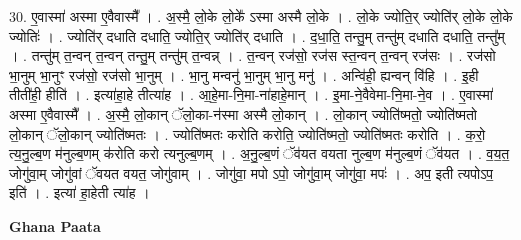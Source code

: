 \documentclass[17pt]{extarticle}
\begin{document}
30. ए॒वास्मा॑ अस्मा ए॒वैवास्मै᳚ । . अ॒स्मै॒ लो॒के लो॒के᳚ ऽस्मा अस्मै लो॒के । . लो॒के ज्योति॒र् ज्योति॑र् लो॒के लो॒के ज्योतिः॑ । . ज्योति॑र् दधाति दधाति॒ ज्योति॒र् ज्योति॑र् दधाति । . द॒धा॒ति॒ तन्तु॒म् तन्तु॑म् दधाति दधाति॒ तन्तु᳚म् । . तन्तु॑म् त॒न्वन् त॒न्वन् तन्तु॒म् तन्तु॑म् त॒न्वन्न् । . त॒न्वन् रज॑सो॒ रज॑स स्त॒न्वन् त॒न्वन् रज॑सः । . रज॑सो भा॒नुम् भा॒नुꣳ रज॑सो॒ रज॑सो भा॒नुम् । . भा॒नु मन्वनु॑ भा॒नुम् भा॒नु मनु॑ । . अन्वि॑ही॒ ह्यन्वन् वि॑हि । . इ॒ही तीती॑ही॒ हीति॑ । . इत्या॑हा॒हे तीत्या॑ह । . आ॒हे॒मा-नि॒मा-ना॑हाहे॒मान् । . इ॒मा-ने॒वैवेमा-नि॒मा-ने॒व । . ए॒वास्मा॑ अस्मा ए॒वैवास्मै᳚ । . अ॒स्मै॒ लो॒कान् ॅलो॒का-न॑स्मा अस्मै लो॒कान् । . लो॒कान् ज्योति॑ष्मतो॒ ज्योति॑ष्मतो लो॒कान् ॅलो॒कान् ज्योति॑ष्मतः । . ज्योति॑ष्मतः करोति करोति॒ ज्योति॑ष्मतो॒ ज्योति॑ष्मतः करोति । . क॒रो॒ त्य॒नु॒ल्ब॒ण म॑नुल्ब॒णम् क॑रोति करो त्यनुल्ब॒णम् । . अ॒नु॒ल्ब॒णं ॅव॑यत वयता नुल्ब॒ण म॑नुल्ब॒णं ॅव॑यत । . व॒य॒त॒ जोगु॑वा॒म् जोगु॑वां ॅवयत वयत॒ जोगु॑वाम् । . जोगु॑वा॒ मपो ऽपो॒ जोगु॑वा॒म् जोगु॑वा॒ मपः॑ । . अप॒ इती त्यपोऽप॒ इति॑ । . इत्या॑ हा॒हेती त्या॑ह । \newline

\textbf{Ghana Paata } \newline
\end{document}
